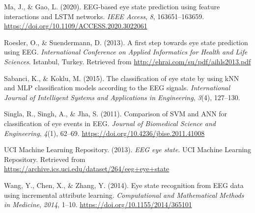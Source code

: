 \documentclass[
  doc]{apa6}
\newlength{\cslhangindent}
\newenvironment{CSLReferences}[2] %
 {\begin{list}{}{%
  \setlength{\itemindent}{0pt}
  \setlength{\leftmargin}{0pt}
  \setlength{\parsep}{0pt}
  \ifodd #1
   \setlength{\leftmargin}{\cslhangindent}
   \setlength{\itemindent}{-1\cslhangindent}
  \fi
  \setlength{\itemsep}{#2\baselineskip}}}
 {\end{list}}
\begin{document}
\label{refs}
\begin{CSLReferences}{1}{0}
Ma, J., \& Gao, L. (2020). EEG-based eye state prediction using feature interactions and LSTM networks. \emph{IEEE Access}, \emph{8}, 163651--163659. \url{https://doi.org/10.1109/ACCESS.2020.3022061}

Roesler, O., \& Suendermann, D. (2013). A first step towards eye state prediction using EEG. \emph{International Conference on Applied Informatics for Health and Life Sciences}. Istanbul, Turkey. Retrieved from \url{http://ehrai.com/su/pdf/aihls2013.pdf}

Sabanci, K., \& Koklu, M. (2015). The classification of eye state by using kNN and MLP classification models according to the EEG signals. \emph{International Journal of Intelligent Systems and Applications in Engineering}, \emph{3}(4), 127--130.

Singla, R., Singh, A., \& Jha, S. (2011). Comparison of SVM and ANN for classification of eye events in EEG. \emph{Journal of Biomedical Science and Engineering}, \emph{4}(1), 62--69. \url{https://doi.org/10.4236/jbise.2011.41008}

UCI Machine Learning Repository. (2013). \emph{EEG eye state}. UCI Machine Learning Repository. Retrieved from \url{https://archive.ics.uci.edu/dataset/264/eeg+eye+state}

Wang, Y., Chen, X., \& Zhang, Y. (2014). Eye state recognition from EEG data using incremental attribute learning. \emph{Computational and Mathematical Methods in Medicine}, \emph{2014}, 1--10. \url{https://doi.org/10.1155/2014/365101}

\end{CSLReferences}
\end{document}
